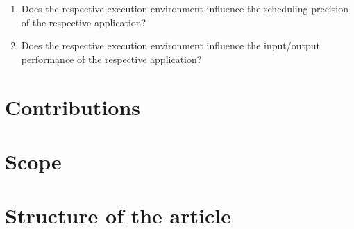 \begin{enumerate}[label=\textbf{RQ\arabic*}]
\label{section:rqs}
	\item Does the respective execution environment influence the scheduling precision of the respective application?
	\item Does the respective execution environment influence the input/output performance of the respective application?\\
\end{enumerate}








\section{Contributions}


\section{Scope}

\section{Structure of the article}



	